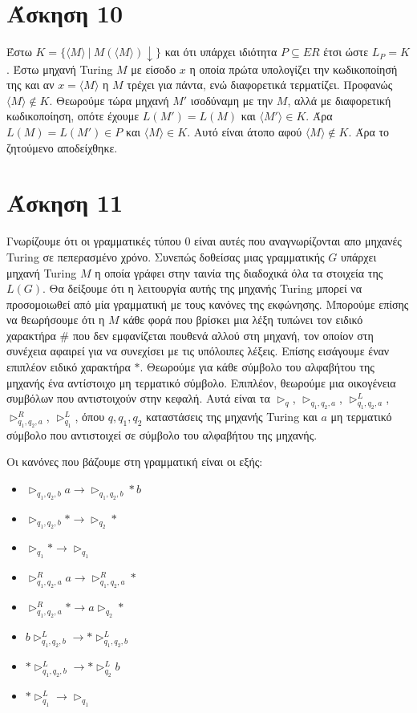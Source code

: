\documentclass[a4paper, oneside, 11pt]{article}
\theoremstyle{definition}
\begin{document}
\section*{Άσκηση 10}
Έστω $K=\{\langle M\rangle\ |\ M(\langle M\rangle)\downarrow \}$ και ότι υπάρχει ιδιότητα $P\subseteq ER$ έτσι ώστε $L_P = K$. Έστω μηχανή Turing $Μ$ με είσοδο $x$
η οποία πρώτα υπολογίζει την κωδικοποίησή της και αν $x=\langle M\rangle$ η $M$ τρέχει για πάντα, ενώ διαφορετικά τερματίζει. Προφανώς $\langle M\rangle\notin K$.
Θεωρούμε τώρα μηχανή $M'$ ισοδύναμη με την $M$, αλλά με διαφορετική κωδικοποίηση, οπότε έχουμε $L(M')=L(M)$ και $\langle M'\rangle \in K$. 
Άρα $L(M)=L(M')\in P$ και $\langle M\rangle \in K$. 
Αυτό είναι
άτοπο αφού $\langle M\rangle\notin K$. Άρα το ζητούμενο αποδείχθηκε.

\section*{Άσκηση 11}
Γνωρίζουμε ότι οι γραμματικές τύπου $0$ είναι αυτές που αναγνωρίζονται απο μηχανές Turing σε πεπερασμένο χρόνο. Συνεπώς δοθείσας μιας γραμματικής $G$ υπάρχει μηχανή Turing
$M$ η οποία γράφει στην ταινία της διαδοχικά όλα τα στοιχεία της $L(G)$. Θα δείξουμε ότι η λειτουργία αυτής της μηχανής Turing μπορεί να προσομοιωθεί από μία γραμματική
με τους κανόνες της εκφώνησης. Μπορούμε επίσης να θεωρήσουμε ότι η $M$ κάθε φορά που βρίσκει μια λέξη τυπώνει τον ειδικό χαρακτήρα $\#$ που δεν εμφανίζεται πουθενά αλλού στη
μηχανή, τον οποίον στη συνέχεια αφαιρεί για να
συνεχίσει με τις υπόλοιπες λέξεις. Επίσης εισάγουμε έναν επιπλέον ειδικό χαρακτήρα $*$. 
Θεωρούμε για κάθε σύμβολο του αλφαβήτου της μηχανής ένα αντίστοιχο μη τερματικό σύμβολο. Επιπλέον, θεωρούμε μια οικογένεια συμβόλων που
αντιστοιχούν στην κεφαλή. Αυτά είναι τα $\triangleright_q$, $\triangleright_{q_1,q_2,a}$, $\triangleright_{q_1,q_2,a}^L$, $\triangleright_{q_1,q_2,a}^R$, $\triangleright_{q_1}^L$, όπου $q,q_1,q_2$
καταστάσεις της μηχανής Turing και $a$ μη τερματικό σύμβολο που αντιστοιχεί σε σύμβολο του αλφαβήτου της μηχανής.

Οι κανόνες που βάζουμε στη γραμματική είναι οι εξής:
\begin{itemize}
\item{$\triangleright_{q_1,q_2,b} a\rightarrow \triangleright_{q_1,q_2,b}*b$}
\item{$\triangleright_{q_1,q_2,b}*\rightarrow\triangleright_{q_2}*$}
\item{$\triangleright_{q_1}*\rightarrow\triangleright_{q_1}$}
\item{$\triangleright_{q_1,q_2,a}^R a\rightarrow \triangleright_{q_1,q_2,a}^R*$}
\item{$\triangleright_{q_1,q_2,a}^R*\rightarrow a\triangleright_{q_2}*$}
\item{$b\triangleright_{q_1,q_2,b}^L\rightarrow *\triangleright_{q_1,q_2,b}^L$}
\item{$*\triangleright_{q_1,q_2,b}^L\rightarrow *\triangleright_{q_2}^L b$}
\item{$*\triangleright_{q_1}^L\rightarrow \triangleright_{q_1}$}
\end{itemize}
\end{document}
